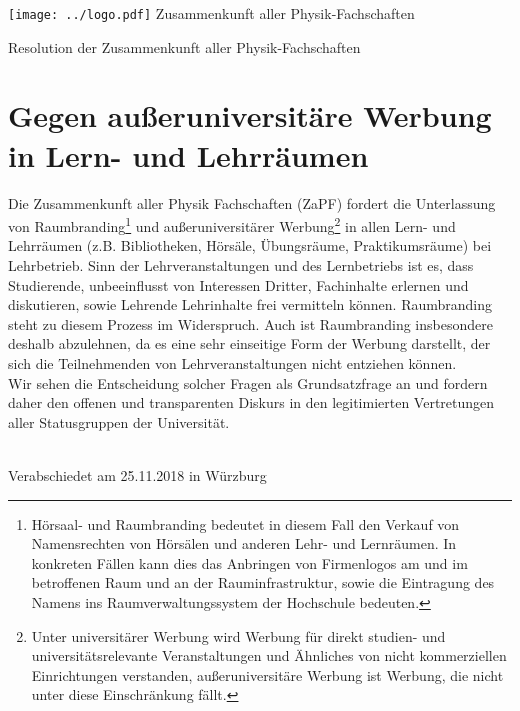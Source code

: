 \documentclass[DIV=calc]{scrartcl}
\begin{document}
    \hspace{0.87\textwidth}
    \begin{minipage}{120pt}
        \vspace{-1.8cm}
        \texttt{[image: ../logo.pdf]}
        \centering
        \small Zusammenkunft aller Physik-Fachschaften
    \end{minipage}
    \begin{center}
        \huge{Resolution der Zusammenkunft aller Physik-Fachschaften}\vspace{.25\baselineskip}\\
        \normalsize
    \end{center}
    \vspace{1cm}

\section*{Gegen außeruniversitäre Werbung in Lern- und Lehrräumen}
Die Zusammenkunft aller Physik Fachschaften (ZaPF) fordert die Unterlassung von Raumbranding\footnote{Hörsaal- und Raumbranding bedeutet in diesem Fall den Verkauf von Namensrechten von
Hörsälen und anderen Lehr- und Lernräumen. In konkreten Fällen kann dies das Anbringen von
Firmenlogos am und im betroffenen Raum und an der Rauminfrastruktur, sowie die Eintragung des
Namens ins Raumverwaltungssystem der Hochschule bedeuten.} und außeruniversitärer Werbung\footnote{Unter universitärer Werbung wird Werbung für direkt studien- und universitätsrelevante
Veranstaltungen und Ähnliches von nicht kommerziellen Einrichtungen verstanden,
außeruniversitäre Werbung ist Werbung, die nicht unter diese Einschränkung fällt.} in allen Lern- und Lehrräumen (z.B. Bibliotheken, Hörsäle,
Übungsräume, Praktikumsräume) bei Lehrbetrieb.
Sinn der Lehrveranstaltungen und des Lernbetriebs ist es, dass Studierende, unbeeinflusst von
Interessen Dritter, Fachinhalte erlernen und diskutieren, sowie Lehrende Lehrinhalte frei vermitteln
können. Raumbranding steht zu diesem Prozess im Widerspruch.
Auch ist Raumbranding insbesondere deshalb abzulehnen, da es eine sehr einseitige Form der
Werbung darstellt, der sich die Teilnehmenden von Lehrveranstaltungen nicht entziehen können.\\
Wir sehen die Entscheidung solcher Fragen als Grundsatzfrage an und fordern daher den offenen
und transparenten Diskurs in den legitimierten Vertretungen aller Statusgruppen der Universität.\vspace{2\baselineskip}\\~
\vfill
    \begin{flushright}
        Verabschiedet am 25.11.2018 in Würzburg
    \end{flushright}
\end{document}
